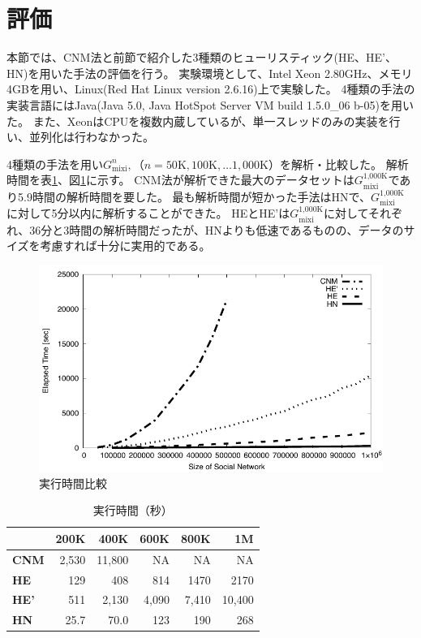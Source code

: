 \documentclass [a4j,11pt] {jsarticle}
\begin{document}
\section {評価}
\label {sect: evaluation}

本節では、CNM法と前節で紹介した3種類のヒューリスティック(HE、HE'、HN)を用いた手法の評価を行う。
実験環境として、Intel Xeon 2.80GHz、メモリ4GBを用い、Linux(Red Hat Linux version 2.6.16)上で実験した。
4種類の手法の実装言語にはJava(Java 5.0, Java HotSpot Server VM build 1.5.0\_06 b-05)を用いた。
また、XeonはCPUを複数内蔵しているが、単一スレッドのみの実装を行い、並列化は行わなかった。

4種類の手法を用い$G_{\text {mixi}}^n,（n = 50\text{K}, 100\text{K}, \ldots 1,000\text{K}）$を解析・比較した。 
解析時間を表\ref{tbl: elapsed time}、図\ref{fig: compete time}に示す。
CNM法が解析できた最大のデータセットは$G_{\text{mixi}}^{\text{1,000K}}$であり5.9時間の解析時間を要した。
最も解析時間が短かった手法はHNで、$G_{\text{mixi}}^{\text{1,000K}}$に対して5分以内に解析することができた。
HEとHE'は$G_{\text{mixi}}^{\text{1,000K}}$に対してそれぞれ、36分と3時間の解析時間だったが、HNよりも低速であるものの、データのサイズを考慮すれば十分に実用的である。

\begin {figure}[htbp]
  \centerline {\includegraphics [width=0.80\linewidth]{fig5-all-etime-size.pdf}}
  \caption {実行時間比較}
  \label {fig: compete time}
\end{figure}

\begin {table}
  \caption {実行時間（秒）}
  \label {tbl: elapsed time}
  \begin {center}
    \begin {tabular}{lrrrrr} \\ \hline
          & 200K & 400K & 600K & 800K & 1M \\ \hline
      \textbf {CNM}& 2,530 & 11,800 & NA & NA & NA \\
      \textbf {HE}  & 129  & 408  & 814  & 1470 & 2170 \\
      \textbf {HE'} & 511  & 2,130 & 4,090 & 7,410 & 10,400 \\
      \textbf {HN}  & 25.7 & 70.0 & 123  & 190  & 268 \\
      \hline
    \end {tabular}
  \end {center}
\end {table}
\end{document}
